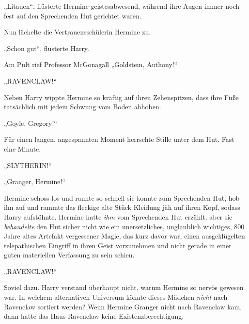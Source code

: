 
„Litauen“, flüsterte Hermine geistesabwesend, während ihre Augen immer noch fest auf den Sprechenden Hut gerichtet waren.

Nun lächelte die Vertrauensschülerin Hermine zu.

„Schon gut“, flüsterte Harry.

Am Pult rief Professor McGonagall „Goldstein, Anthony!“

„RAVENCLAW!“

Neben Harry wippte Hermine so kräftig auf ihren Zehenspitzen, dass ihre Füße tatsächlich mit jedem Schwung vom Boden abhoben.

„Goyle, Gregory!“

Für einen langen, angespannten Moment herrschte Stille unter dem Hut. Fast eine Minute.

„SLYTHERIN!“

„Granger, Hermine!“

Hermine schoss los und rannte so schnell sie konnte zum Sprechenden Hut, hob ihn auf und rammte das fleckige alte Stück Kleidung jäh auf ihren Kopf, sodass Harry aufstöhnte. Hermine hatte \emph{ihm} vom Sprechenden Hut erzählt, aber sie \emph{behandelte } den Hut sicher nicht wie ein unersetzliches, unglaublich wichtiges, 800 Jahre altes Artefakt vergessener Magie, das kurz davor war, einen ausgeklügelten telepathischen Eingriff in ihren Geist vorzunehmen und nicht gerade in einer guten materiellen Verfassung zu sein schien.

„RAVENCLAW!“

Soviel dazu. Harry verstand überhaupt nicht, warum Hermine so nervös gewesen war. In welchem alternativen Universum könnte dieses Mädchen \emph{nicht} nach Ravenclaw sortiert werden? Wenn Hermine Granger nicht nach Ravenclaw kam, dann hatte das Haus Ravenclaw keine Existenzberechtigung.

